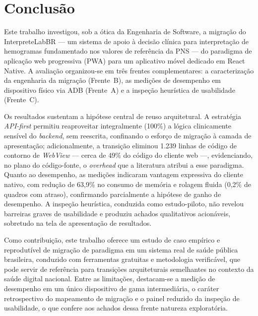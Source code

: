
\section{Conclusão}
\label{sec:conclusao}

Este trabalho investigou, sob a ótica da Engenharia de Software, a migração do
InterpreteLabBR --- um sistema de apoio à decisão clínica para interpretação de
hemogramas fundamentado nos valores de referência da PNS --- do paradigma de
aplicação web progressiva (PWA) para um aplicativo móvel dedicado em React Native.
A avaliação organizou-se em três frentes complementares: a caracterização da
engenharia da migração (Frente~B), as medições de desempenho em dispositivo físico
via ADB (Frente~A) e a inspeção heurística de usabilidade (Frente~C).

Os resultados sustentam a hipótese central de reuso arquitetural. A estratégia
\emph{API-first} permitiu reaproveitar integralmente (100\%) a lógica clinicamente
sensível do \emph{backend}, sem reescrita, confinando o esforço de migração à
camada de apresentação; adicionalmente, a transição eliminou 1.239 linhas de código
de contorno de \emph{WebView} --- cerca de 49\% do código do cliente web ---,
evidenciando, no plano do código-fonte, o \emph{overhead} que a literatura atribui
a esse paradigma. Quanto ao desempenho, as medições indicaram vantagem expressiva
do cliente nativo, com redução de 63,9\% no consumo de memória e rolagem fluida
(0,2\% de quadros com atraso), confirmando parcialmente a hipótese de ganho de
desempenho. A inspeção heurística, conduzida como estudo-piloto, não revelou
barreiras graves de usabilidade e produziu achados qualitativos acionáveis,
sobretudo na tela de apresentação de resultados.

Como contribuição, este trabalho oferece um estudo de caso empírico e reprodutível
de migração de paradigma em um sistema real de saúde pública brasileira, conduzido
com ferramentas gratuitas e metodologia verificável, que pode servir de referência
para transições arquiteturais semelhantes no contexto da saúde digital nacional.
Entre as limitações, destacam-se a medição de desempenho em um único dispositivo de
gama intermediária, o caráter retrospectivo do mapeamento de migração e o painel
reduzido da inspeção de usabilidade, o que confere aos achados dessa frente natureza
exploratória.


